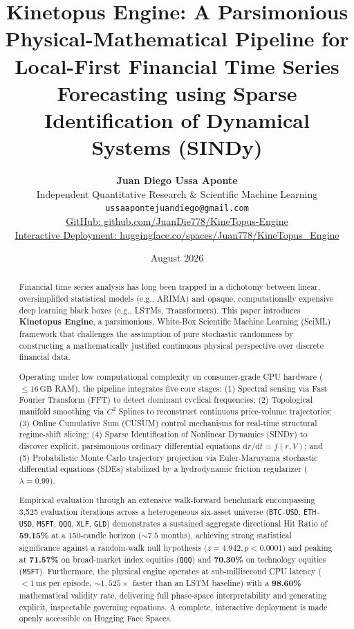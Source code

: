 \documentclass[11pt,a4paper]{article}
\title{\textbf{\LARGE Kinetopus Engine: A Parsimonious Physical-Mathematical Pipeline for Local-First Financial Time Series Forecasting using Sparse Identification of Dynamical Systems (SINDy)}}
\author{
    \textbf{Juan Diego Ussa Aponte} \\
    Independent Quantitative Research \& Scientific Machine Learning \\
    \texttt{ussaapontejuandiego@gmail.com} \\
    \href{https://github.com/JuanDie778/KineTopus-Engine}{GitHub: github.com/JuanDie778/KineTopus-Engine} \\
    \href{https://huggingface.co/spaces/Juan778/KineTopus_Engine}{Interactive Deployment: huggingface.co/spaces/Juan778/KineTopus\_Engine}
}
\date{August 2026}
\begin{document}
\maketitle

\begin{abstract}
Financial time series analysis has long been trapped in a dichotomy between linear, oversimplified statistical models (e.g., ARIMA) and opaque, computationally expensive deep learning black boxes (e.g., LSTMs, Transformers). This paper introduces \textbf{Kinetopus Engine}, a parsimonious, White-Box Scientific Machine Learning (SciML) framework that challenges the assumption of pure stochastic randomness by constructing a mathematically justified continuous physical perspective over discrete financial data.

Operating under low computational complexity on consumer-grade CPU hardware ($\le 16\,\text{GB}$ RAM), the pipeline integrates five core stages: (1) Spectral sensing via Fast Fourier Transform (FFT) to detect dominant cyclical frequencies; (2) Topological manifold smoothing via $C^2$ Splines to reconstruct continuous price-volume trajectories; (3) Online Cumulative Sum (CUSUM) control mechanisms for real-time structural regime-shift slicing; (4) Sparse Identification of Nonlinear Dynamics (SINDy) to discover explicit, parsimonious ordinary differential equations $\mathrm{d}r/\mathrm{d}t = f(r, V)$; and (5) Probabilistic Monte Carlo trajectory projection via Euler-Maruyama stochastic differential equations (SDEs) stabilized by a hydrodynamic friction regularizer ($\lambda = 0.99$).

Empirical evaluation through an extensive walk-forward benchmark encompassing 3,525 evaluation iterations across a heterogeneous six-asset universe (\texttt{BTC-USD}, \texttt{ETH-USD}, \texttt{MSFT}, \texttt{QQQ}, \texttt{XLF}, \texttt{GLD}) demonstrates a sustained aggregate directional Hit Ratio of \textbf{59.15\%} at a 150-candle horizon ($\sim 7.5$ months), achieving strong statistical significance against a random-walk null hypothesis ($z = 4.942, p < 0.0001$) and peaking at \textbf{71.57\%} on broad-market index equities (\texttt{QQQ}) and \textbf{70.30\%} on technology equities (\texttt{MSFT}). Furthermore, the physical engine operates at sub-millisecond CPU latency ($<1\,\text{ms}$ per episode, $\sim 1,525\times$ faster than an LSTM baseline) with a \textbf{98.60\%} mathematical validity rate, delivering full phase-space interpretability and generating explicit, inspectable governing equations. A complete, interactive deployment is made openly accessible on Hugging Face Spaces.
\end{abstract}
\end{document}
